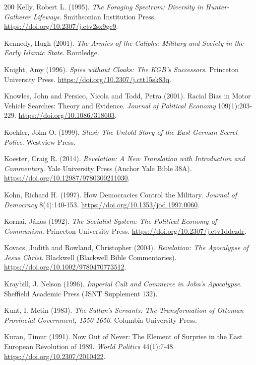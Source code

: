\documentclass[11pt,letterpaper]{article}
\theoremstyle{definition}
\theoremstyle{remark}
\begin{document}
\begin{thebibliography}{200}
Kelly, Robert L. (1995). \emph{The Foraging Spectrum: Diversity in Hunter-Gatherer Lifeways}. Smithsonian Institution Press. \url{https://doi.org/10.2307/j.ctv2sx9gc9}.

Kennedy, Hugh (2001). \emph{The Armies of the Caliphs: Military and Society in the Early Islamic State}. Routledge.

Knight, Amy (1996). \emph{Spies without Cloaks: The KGB's Successors}. Princeton University Press. \url{https://doi.org/10.2307/j.ctt15sk83q}.

Knowles, John and Persico, Nicola and Todd, Petra (2001). Racial Bias in Motor Vehicle Searches: Theory and Evidence. \emph{Journal of Political Economy} 109(1):203-229. \url{https://doi.org/10.1086/318603}.

Koehler, John O. (1999). \emph{Stasi: The Untold Story of the East German Secret Police}. Westview Press.

Koester, Craig R. (2014). \emph{Revelation: A New Translation with Introduction and Commentary}. Yale University Press (Anchor Yale Bible 38A). \url{https://doi.org/10.12987/9780300211030}.

Kohn, Richard H. (1997). How Democracies Control the Military. \emph{Journal of Democracy} 8(4):140-153. \url{https://doi.org/10.1353/jod.1997.0060}.

Kornai, J\'anos (1992). \emph{The Socialist System: The Political Economy of Communism}. Princeton University Press. \url{https://doi.org/10.2307/j.ctv1ddczdr}.

Kovacs, Judith and Rowland, Christopher (2004). \emph{Revelation: The Apocalypse of Jesus Christ}. Blackwell (Blackwell Bible Commentaries). \url{https://doi.org/10.1002/9780470773512}.

Kraybill, J. Nelson (1996). \emph{Imperial Cult and Commerce in John's Apocalypse}. Sheffield Academic Press (JSNT Supplement 132).

Kunt, I. Metin (1983). \emph{The Sultan's Servants: The Transformation of Ottoman Provincial Government, 1550-1650}. Columbia University Press.

Kuran, Timur (1991). Now Out of Never: The Element of Surprise in the East European Revolution of 1989. \emph{World Politics} 44(1):7-48. \url{https://doi.org/10.2307/2010422}.


\end{thebibliography}
\end{document}
